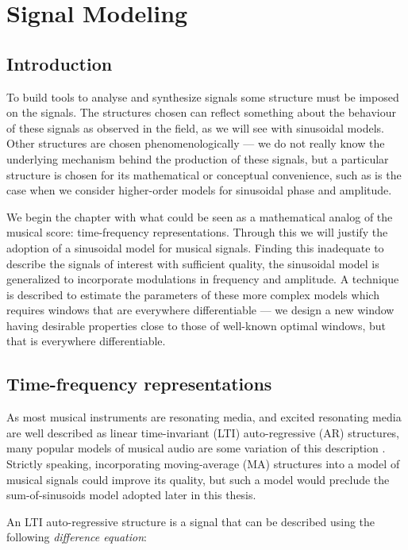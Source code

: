 \chapter{Signal Modeling\label{chap:sigmod}}

\section{Introduction}

To build tools to analyse and synthesize signals some structure must be imposed
on the signals. The structures chosen can reflect something about the behaviour
of these signals as observed in the field, as we will see with sinusoidal
models. Other structures are chosen phenomenologically --- we do not really know
the underlying mechanism behind the production of these signals, but a
particular structure is chosen for its mathematical or conceptual convenience,
such as is the case when we consider higher-order models for sinusoidal phase
and amplitude.

We begin the chapter with what could be seen as a mathematical analog of the
musical score: time-frequency representations. Through this we will justify the
adoption of a sinusoidal model for musical signals. Finding this inadequate to
describe the signals of interest with sufficient quality, the sinusoidal model
is generalized to incorporate modulations in frequency and amplitude. A
technique is described to estimate the parameters of these more complex models
which requires windows that are everywhere differentiable --- we design a new
window having desirable properties close to those of well-known optimal windows,
but that is everywhere differentiable.

\section{Time-frequency representations \label{sec:timefreqrep}}

As most musical instruments are resonating media, and excited resonating media
are well described as linear time-invariant (LTI) auto-regressive (AR)
structures, many popular models of musical audio are some variation of this
description \cite{fletcher2012physics}. Strictly speaking, incorporating
moving-average (MA) structures into a model of musical signals could improve its
quality, but such a model would preclude the sum-of-sinusoids model adopted
later in this thesis.

An LTI auto-regressive structure is a signal that can be described using the
following \textit{difference equation}:

